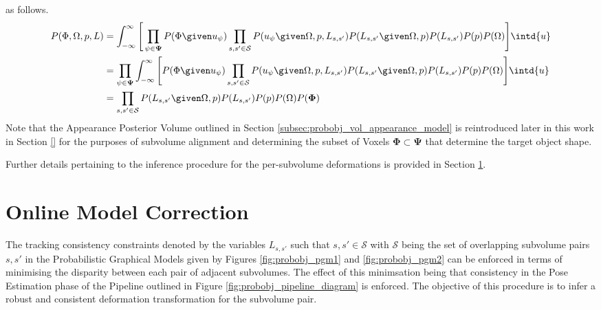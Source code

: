 
as follows.
\begin{equation}
  \label{eqn:probobj_appearanc_marginal}
  \begin{split}
    P(\Phi, \Omega, p, L) & =
    \int_{-\infty}^{\infty} \Bigg[ 
    \prod_{\psi \in \mathbf{\Psi}} P(\Phi \given u_{\psi})
    \prod_{s, s' \in \mathcal{S}}P(u_{\psi} \given \Omega, p, L_{s, s'})
    P(L_{s, s'} \given \Omega, p) P(L_{s, s'})P(p)P(\Omega) \Bigg] \intd{u} \\
    & = \prod_{\psi \in \mathbf{\Psi}} 
    \int_{-\infty}^{\infty} \Bigg[ P(\Phi \given u_{\psi})
    \prod_{s, s' \in \mathcal{S}}P(u_{\psi} \given \Omega, p, L_{s, s'})
    P(L_{s, s'} \given \Omega, p) P(L_{s, s'})P(p)P(\Omega) \Bigg] \intd{u} \\
    & = \prod_{s, s' \in \mathcal{S}} P(L_{s, s'} \given \Omega, p)
    P(L_{s, s'})P(p)P(\Omega)P(\mathbf{\Phi})
  \end{split}
\end{equation}
Note that the Appearance Posterior Volume outlined in Section 
\ref{subsec:probobj_vol_appearance_model} is reintroduced later in this work in
Section \ref{} for the purposes of subvolume alignment and determining the
subset of Voxels $\mathbf{\Phi} \subset \mathbf{\Psi}$ that determine the target
object shape.

Further details pertaining to the inference procedure for the per-subvolume
deformations is provided in Section \ref{sec:probobj_model_correction}.

\section{Online Model Correction}
\label{sec:probobj_model_correction}
The tracking consistency constraints denoted by the variables $L_{s, s'}$ such
that $s, s' \in \mathcal{S}$ with $\mathcal{S}$ being the set of overlapping
subvolume pairs $s, s'$ in the Probabilistic Graphical Models given by Figures
\ref{fig:probobj_pgm1} and \ref{fig:probobj_pgm2} can be enforced in terms of
minimising the disparity between each pair of adjacent subvolumes. The effect of
this minimsation being that consistency in the Pose Estimation phase of the
Pipeline outlined in Figure \ref{fig:probobj_pipeline_diagram} is enforced. The
objective of this procedure is to infer a robust and consistent deformation
transformation for the subvolume pair.

